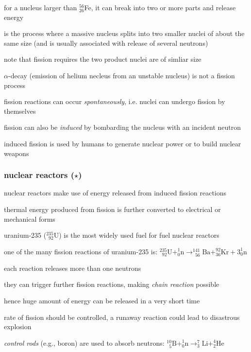 for a nucleus larger than $^{56}_{26}$Fe, it can break into two or more parts and release energy

\begin{ilight}
	 is the process where a massive nucleus splits into two smaller nuclei of about the same size (and is usually associated with release of several neutrons)
\end{ilight}

\cmt note that fission requires the two product nuclei are of simliar size

$\alpha$-decay (emission of helium necleus from an unstable nucleus) is not a fission process

\cmt fission reactions can occur \emph{spontaneously}, i.e. nuclei can undergo fission by themselves

fission can also be \emph{induced} by bombarding the nucleus with an incident neutron

induced fission is used by humans to generate nuclear power or to build nuclear weapons

\subsubsection*{nuclear reactors ($\star$)}

nuclear reactors make use of energy released from induced fission reactions

thermal energy produced from fission is further converted to electrical or mechanical forms

uranium-235 ($^{235}_{\phantom{1}92}\text{U}$) is the most widely used fuel for fuel nuclear reactors

one of the many fission reactions of uranium-235 is: $^{235}_{\phantom{1}92}\text{U} + ^1_0\text{n} \longrightarrow  ^{141}_{\phantom{1}56}\text{Ba} + ^{92}_{36}\text{Kr} + 3^1_0\text{n}$

\cmt each reaction releases more than one neutrons

they can trigger further fission reactions, making \emph{chain reaction} possible

hence huge amount of energy can be released in a very short time

\cmt rate of fission should be controlled, a runaway reaction could lead to disastrous explosion

\emph{control rods} (e.g., boron) are used to absorb neutrons: $^{10}_{\phantom{1}5}\text{B} + ^1_0\text{n} \longrightarrow  ^{7}_{3}\text{Li} + ^{4}_{2}\text{He}$

